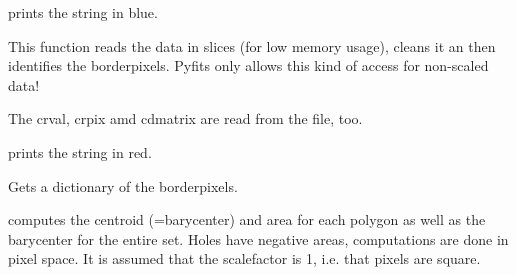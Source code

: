 \documentclass[letterpaper,10pt,english]{sphinxmanual}
\begin{document}
\begin{fulllineitems}
\label{SamPy.astronomy:SamPy.astronomy.footprintfinder.alert}
prints the string in blue.

\end{fulllineitems}



\begin{fulllineitems}
\label{SamPy.astronomy:SamPy.astronomy.footprintfinder.directborder}
This function reads the data in slices (for low memory usage), cleans it an then
identifies the borderpixels. Pyfits only allows this kind of access for non-scaled data!

The crval, crpix amd cdmatrix are read from the file, too.

\end{fulllineitems}



\begin{fulllineitems}
\label{SamPy.astronomy:SamPy.astronomy.footprintfinder.error}
prints the string in red.

\end{fulllineitems}



\begin{fulllineitems}
\label{SamPy.astronomy:SamPy.astronomy.footprintfinder.getborderdictionary}
Gets a dictionary of the borderpixels.

\end{fulllineitems}



\begin{fulllineitems}
\label{SamPy.astronomy:SamPy.astronomy.footprintfinder.getcentroid}
computes the centroid (=barycenter) and area for each polygon as well as the barycenter for the entire set.
Holes have negative areas, computations are done in pixel space. It is assumed that the scalefactor is 1, i.e.
that pixels are square.

\end{fulllineitems}
\end{document}
